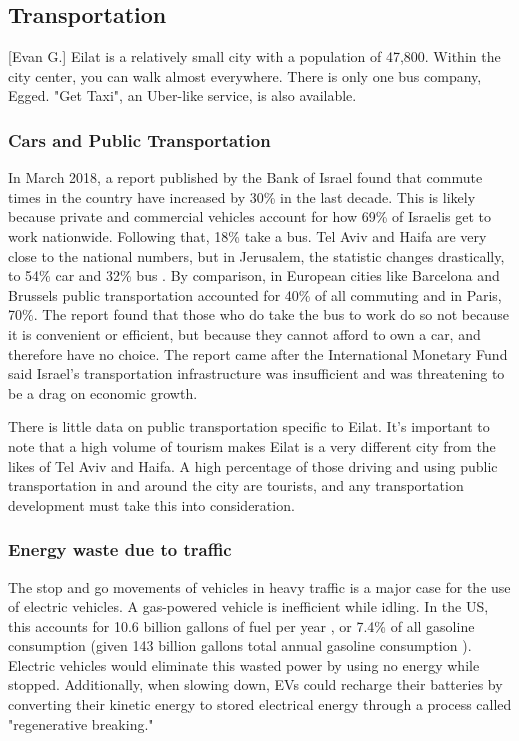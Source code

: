 \documentclass[12pt]{article}                         %
\begin{document}
\subsection{Transportation}[Evan G.]
Eilat is a relatively small city with a population of 47,800. Within the city center, you can walk almost everywhere. There is only one bus company, Egged. \cite{TransportationEilat} "Get Taxi", an Uber-like service, is also available. 

\subsubsection{Cars and Public Transportation}
In March 2018, a report published by the Bank of Israel found that commute times in the country have increased by 30\% in the last decade. This is likely because private and commercial vehicles account for how 69\% of Israelis get to work nationwide. Following that, 18\% take a bus. Tel Aviv and Haifa are very close to the national numbers, but in Jerusalem, the statistic changes drastically, to 54\% car and 32\% bus \cite{Dori2018IsraeliRoads}. By comparison, in European cities like Barcelona and Brussels public transportation accounted for 40\% of all commuting and in Paris, 70\%. The report found that those who do take the bus to work do so not because it is convenient or efficient, but because they cannot afford to own a car, and therefore have no choice. The report came after the International Monetary Fund said Israel’s transportation infrastructure was insufficient and was threatening to be a drag on economic growth. 

There is little data on public transportation specific to Eilat. It's important to note that a high volume of tourism makes Eilat is a very different city from the likes of Tel Aviv and Haifa. A high percentage of those driving and using public transportation in and around the city are tourists, and any transportation development must take this into consideration.

\subsubsection{Energy waste due to traffic}
The stop and go movements of vehicles in heavy traffic is a major case for the use of electric vehicles. A gas-powered vehicle is inefficient while idling. In the US, this accounts for 10.6 billion gallons of fuel per year \cite{Carrico2009CostlyVehicles}, or 7.4\% of all gasoline consumption (given 143 billion gallons total annual gasoline consumption \cite{Administration2018HowConsume}). Electric vehicles would eliminate this wasted power by using no energy while stopped. Additionally, when slowing down, EVs could recharge their batteries by converting their kinetic energy to stored electrical energy through a process called "regenerative breaking."
\end{document}
